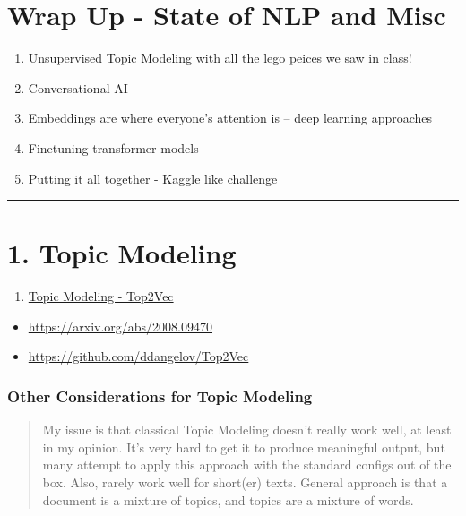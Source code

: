 \documentclass[
]{article}
\author{}
\date{\vspace{-2.5em}}
\providecommand{\tightlist}{%
  \setlength{\itemsep}{0pt}\setlength{\parskip}{0pt}}
\begin{document}
\hypertarget{wrap-up---state-of-nlp-and-misc}{%
\section{Wrap Up - State of NLP and
Misc}\label{wrap-up---state-of-nlp-and-misc}}

\begin{enumerate}
\def\labelenumi{\arabic{enumi}.}
\tightlist
\item
  Unsupervised Topic Modeling with all the lego peices we saw in class!
\item
  Conversational AI
\item
  Embeddings are where everyone's attention is -- deep learning
  approaches
\item
  Finetuning transformer models
\item
  Putting it all together - Kaggle like challenge
\end{enumerate}

\begin{center}\rule{0.5\linewidth}{0.5pt}\end{center}

\hypertarget{topic-modeling}{%
\section{1. Topic Modeling}\label{topic-modeling}}

\begin{enumerate}
\def\labelenumi{\arabic{enumi}.}
\tightlist
\item
  \href{https://colab.research.google.com/drive/18zD1I_WYRw_DmXVqaUQ4by7GbOPCabGN?usp=sharing}{Topic
  Modeling - Top2Vec}
\end{enumerate}

\begin{itemize}
\tightlist
\item
  \url{https://arxiv.org/abs/2008.09470}
\item
  \url{https://github.com/ddangelov/Top2Vec}
\end{itemize}

\hypertarget{other-considerations-for-topic-modeling}{%
\subsubsection{Other Considerations for Topic
Modeling}\label{other-considerations-for-topic-modeling}}

\begin{quote}
My issue is that classical Topic Modeling doesn't really work well, at
least in my opinion. It's very hard to get it to produce meaningful
output, but many attempt to apply this approach with the standard
configs out of the box. Also, rarely work well for short(er) texts.
General approach is that a document is a mixture of topics, and topics
are a mixture of words.
\end{quote}
\end{document}
